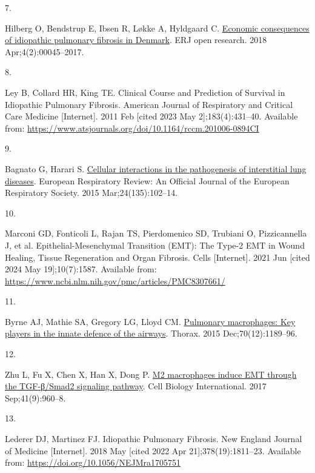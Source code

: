 \documentclass[
]{article}
\newlength{\cslhangindent}
\newlength{\csllabelwidth}
\newenvironment{CSLReferences}[2] %
 {\begin{list}{}{%
  \setlength{\itemindent}{0pt}
  \setlength{\leftmargin}{0pt}
  \setlength{\parsep}{0pt}
  \ifodd #1
   \setlength{\leftmargin}{\cslhangindent}
   \setlength{\itemindent}{-1\cslhangindent}
  \fi
  \setlength{\itemsep}{#2\baselineskip}}}
 {\end{list}}
\newcommand{\CSLLeftMargin}[1]{\parbox[t]{\csllabelwidth}{\strut#1\strut}}
\newcommand{\CSLRightInline}[1]{\parbox[t]{\linewidth - \csllabelwidth}{\strut#1\strut}}
\begin{document}
\begin{CSLReferences}{0}{1}
\CSLLeftMargin{7. }%
\CSLRightInline{Hilberg O, Bendstrup E, Ibsen R, Løkke A, Hyldgaard C. \href{https://doi.org/10.1183/23120541.00045-2017}{Economic consequences of idiopathic pulmonary fibrosis in {Denmark}}. ERJ open research. 2018 Apr;4(2):00045--2017. }

\CSLLeftMargin{8. }%
\CSLRightInline{Ley B, Collard HR, King TE. Clinical {Course} and {Prediction} of {Survival} in {Idiopathic} {Pulmonary} {Fibrosis}. American Journal of Respiratory and Critical Care Medicine {[}Internet{]}. 2011 Feb {[}cited 2023 May 2{]};183(4):431--40. Available from: \url{https://www.atsjournals.org/doi/10.1164/rccm.201006-0894CI}}

\CSLLeftMargin{9. }%
\CSLRightInline{Bagnato G, Harari S. \href{https://doi.org/10.1183/09059180.00003214}{Cellular interactions in the pathogenesis of interstitial lung diseases}. European Respiratory Review: An Official Journal of the European Respiratory Society. 2015 Mar;24(135):102--14. }

\CSLLeftMargin{10. }%
\CSLRightInline{Marconi GD, Fonticoli L, Rajan TS, Pierdomenico SD, Trubiani O, Pizzicannella J, et al. Epithelial-{Mesenchymal} {Transition} ({EMT}): {The} {Type}-2 {EMT} in {Wound} {Healing}, {Tissue} {Regeneration} and {Organ} {Fibrosis}. Cells {[}Internet{]}. 2021 Jun {[}cited 2024 May 19{]};10(7):1587. Available from: \url{https://www.ncbi.nlm.nih.gov/pmc/articles/PMC8307661/}}

\CSLLeftMargin{11. }%
\CSLRightInline{Byrne AJ, Mathie SA, Gregory LG, Lloyd CM. \href{https://doi.org/10.1136/thoraxjnl-2015-207020}{Pulmonary macrophages: Key players in the innate defence of the airways}. Thorax. 2015 Dec;70(12):1189--96. }

\CSLLeftMargin{12. }%
\CSLRightInline{Zhu L, Fu X, Chen X, Han X, Dong P. \href{https://doi.org/10.1002/cbin.10788}{M2 macrophages induce {EMT} through the {TGF}-β/{Smad2} signaling pathway}. Cell Biology International. 2017 Sep;41(9):960--8. }

\CSLLeftMargin{13. }%
\CSLRightInline{Lederer DJ, Martinez FJ. Idiopathic {Pulmonary} {Fibrosis}. New England Journal of Medicine {[}Internet{]}. 2018 May {[}cited 2022 Apr 21{]};378(19):1811--23. Available from: \url{https://doi.org/10.1056/NEJMra1705751}}


\end{CSLReferences}
\end{document}
